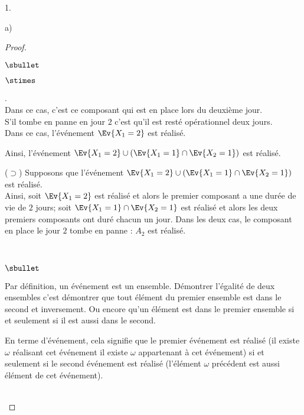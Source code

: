 \begin{noliste}{1.}
\begin{noliste}{a)}
\begin{proof}
\begin{liste}{$\sbullet$}
\begin{noliste}{$\stimes$}
          \item {}.\\
            Dans ce cas, c'est ce composant qui est en place lors du
            deuxième jour.\\
            S'il tombe en panne en jour $2$ c'est qu'il est resté
            opérationnel deux jours.\\[.1cm]
            Dans ce cas, l'événement $\Ev{X_1=2}$ est réalisé.
          \end{noliste}
          Ainsi, l'événement $\Ev{X_1=2} \cup \left(\Ev{X_1=1} \cap
            \Ev{X_2=1} \right)$ est réalisé.
        \item[($\supset$)] Supposons que l'événement $\Ev{X_1=2} \cup
          \left(\Ev{X_1=1} \cap \Ev{X_2=1} \right)$ est réalisé.\\
          Ainsi, soit $\Ev{X_1 = 2}$ est réalisé et alors le premier
          composant a une durée de vie de $2$ jours; soit $\Ev{X_1=1}
          \cap \Ev{X_2=1}$ est réalisé et alors les deux premiers
          composants ont duré chacun un jour. Dans les deux cas, le
          composant en place le jour $2$ tombe en panne : $A_2$ est
          réalisé.
        \end{liste}
        ~\\[-1.1cm]
        \begin{remarkL}{.98}%
          \begin{noliste}{$\sbullet$}
          \item Par définition, un événement est un
            ensemble. Démontrer l'égalité de deux ensembles c'est
            démontrer que tout élément du premier ensemble est dans le
            second et inversement. Ou encore qu'un élément est dans le
            premier ensemble si et seulement si il est aussi dans le
            second.
          \item En terme d'événement, cela signifie que le premier
            événement est réalisé (il existe $\omega$ réalisant cet
            événement \ie il existe $\omega$ appartenant à cet
            événement) si et seulement si le second événement est
            réalisé (l'élément $\omega$ précédent est aussi élément de
            cet événement).
          \end{noliste}          
        \end{remarkL}~\\[-1.4cm]
      \end{proof}


\end{noliste}
\end{noliste}

